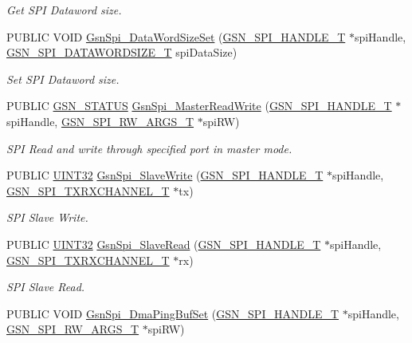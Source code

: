 \begin{DoxyCompactItemize}
\begin{DoxyCompactList}\small\item\em Get SPI Dataword size. \end{DoxyCompactList}\item 
PUBLIC VOID \hyperlink{a00655_ga71fc3b8ddb2373618758cec70b2ccdca}{GsnSpi\_\-DataWordSizeSet} (\hyperlink{a00238}{GSN\_\-SPI\_\-HANDLE\_\-T} $\ast$spiHandle, \hyperlink{a00655_ga63cbe81427185213bde26b93dde72747}{GSN\_\-SPI\_\-DATAWORDSIZE\_\-T} spiDataSize)
\begin{DoxyCompactList}\small\item\em Set SPI Dataword size. \end{DoxyCompactList}\item 
PUBLIC \hyperlink{a00660_gada5951904ac6110b1fa95e51a9ddc217}{GSN\_\-STATUS} \hyperlink{a00655_ga29d51974bb0e80ae4191a339731c3319}{GsnSpi\_\-MasterReadWrite} (\hyperlink{a00238}{GSN\_\-SPI\_\-HANDLE\_\-T} $\ast$spiHandle, \hyperlink{a00239}{GSN\_\-SPI\_\-RW\_\-ARGS\_\-T} $\ast$spiRW)
\begin{DoxyCompactList}\small\item\em SPI Read and write through specified port in master mode. \end{DoxyCompactList}\item 
PUBLIC \hyperlink{a00660_gae1e6edbbc26d6fbc71a90190d0266018}{UINT32} \hyperlink{a00655_ga687e89dafd17ddd4cc90c4b744e3696d}{GsnSpi\_\-SlaveWrite} (\hyperlink{a00238}{GSN\_\-SPI\_\-HANDLE\_\-T} $\ast$spiHandle, \hyperlink{a00241}{GSN\_\-SPI\_\-TXRXCHANNEL\_\-T} $\ast$tx)
\begin{DoxyCompactList}\small\item\em SPI Slave Write. \end{DoxyCompactList}\item 
PUBLIC \hyperlink{a00660_gae1e6edbbc26d6fbc71a90190d0266018}{UINT32} \hyperlink{a00655_gacdf999cddafe165dbbc991808f6db208}{GsnSpi\_\-SlaveRead} (\hyperlink{a00238}{GSN\_\-SPI\_\-HANDLE\_\-T} $\ast$spiHandle, \hyperlink{a00241}{GSN\_\-SPI\_\-TXRXCHANNEL\_\-T} $\ast$rx)
\begin{DoxyCompactList}\small\item\em SPI Slave Read. \end{DoxyCompactList}\item 
PUBLIC VOID \hyperlink{a00587_a25126d53818e98c6503821c4533dc8e9}{GsnSpi\_\-DmaPingBufSet} (\hyperlink{a00238}{GSN\_\-SPI\_\-HANDLE\_\-T} $\ast$spiHandle, \hyperlink{a00239}{GSN\_\-SPI\_\-RW\_\-ARGS\_\-T} $\ast$spiRW)
\item 

\end{DoxyCompactItemize}

